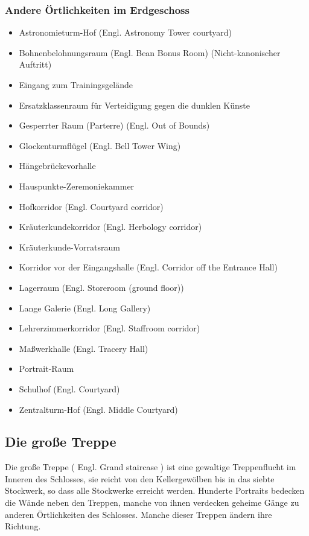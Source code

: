 \documentclass[a4paper, 10pt]{article}
\begin{document}
\subsubsection*{\large Andere Örtlichkeiten im Erdgeschoss}
\vspace{10pt}
\begin{itemize}
    \item Astronomieturm-Hof (Engl. Astronomy Tower courtyard)
    \item Bohnenbelohnungsraum (Engl. Bean Bonus Room) (Nicht-kanonischer Auftritt)
    \item Eingang zum Trainingsgelände
    \item Ersatzklassenraum für Verteidigung gegen die dunklen Künste
    \item Gesperrter Raum (Parterre) (Engl. Out of Bounds)
    \item Glockenturmflügel (Engl. Bell Tower Wing)
    \item Hängebrückevorhalle
    \item Hauspunkte-Zeremoniekammer
    \item Hofkorridor (Engl. Courtyard corridor)
    \item Kräuterkundekorridor (Engl. Herbology corridor)
    \item Kräuterkunde-Vorratsraum
    \item Korridor vor der Eingangshalle (Engl. Corridor off the Entrance Hall)
    \item Lagerraum (Engl. Storeroom (ground floor))
    \item Lange Galerie (Engl. Long Gallery)
    \item Lehrerzimmerkorridor (Engl. Staffroom corridor)
    \item Maßwerkhalle (Engl. Tracery Hall)
    \item Portrait-Raum
    \item Schulhof (Engl. Courtyard)
    \item Zentralturm-Hof (Engl. Middle Courtyard)
\end{itemize}
\subsection*{\Large Die große Treppe}
Die große Treppe (  Engl.  Grand staircase ) ist eine gewaltige Treppenflucht im Inneren des Schlosses, sie reicht von den Kellergewölben bis in das siebte Stockwerk, so dass alle Stockwerke erreicht werden. Hunderte Portraits bedecken die Wände neben den Treppen, manche von ihnen verdecken geheime Gänge zu anderen Örtlichkeiten des Schlosses. Manche dieser Treppen ändern ihre Richtung.
\end{document}
